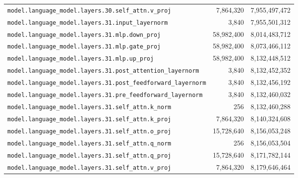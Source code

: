 \documentclass[10pt,a4paper]{article}
\theoremstyle{definition}
\begin{document}
\begin{appendices}
\begin{longtable}{p{9.5cm}rr}
\texttt{model.\allowbreak{}language\_model.\allowbreak{}layers.\allowbreak{}30.\allowbreak{}self\_attn.\allowbreak{}v\_proj} & 7,864,320 & 7,955,497,472 \\
\texttt{model.\allowbreak{}language\_model.\allowbreak{}layers.\allowbreak{}31.\allowbreak{}input\_layernorm} & 3,840 & 7,955,501,312 \\
\texttt{model.\allowbreak{}language\_model.\allowbreak{}layers.\allowbreak{}31.\allowbreak{}mlp.\allowbreak{}down\_proj} & 58,982,400 & 8,014,483,712 \\
\texttt{model.\allowbreak{}language\_model.\allowbreak{}layers.\allowbreak{}31.\allowbreak{}mlp.\allowbreak{}gate\_proj} & 58,982,400 & 8,073,466,112 \\
\texttt{model.\allowbreak{}language\_model.\allowbreak{}layers.\allowbreak{}31.\allowbreak{}mlp.\allowbreak{}up\_proj} & 58,982,400 & 8,132,448,512 \\
\texttt{model.\allowbreak{}language\_model.\allowbreak{}layers.\allowbreak{}31.\allowbreak{}post\_attention\_layernorm} & 3,840 & 8,132,452,352 \\
\texttt{model.\allowbreak{}language\_model.\allowbreak{}layers.\allowbreak{}31.\allowbreak{}post\_feedforward\_layernorm} & 3,840 & 8,132,456,192 \\
\texttt{model.\allowbreak{}language\_model.\allowbreak{}layers.\allowbreak{}31.\allowbreak{}pre\_feedforward\_layernorm} & 3,840 & 8,132,460,032 \\
\texttt{model.\allowbreak{}language\_model.\allowbreak{}layers.\allowbreak{}31.\allowbreak{}self\_attn.\allowbreak{}k\_norm} & 256 & 8,132,460,288 \\
\texttt{model.\allowbreak{}language\_model.\allowbreak{}layers.\allowbreak{}31.\allowbreak{}self\_attn.\allowbreak{}k\_proj} & 7,864,320 & 8,140,324,608 \\
\texttt{model.\allowbreak{}language\_model.\allowbreak{}layers.\allowbreak{}31.\allowbreak{}self\_attn.\allowbreak{}o\_proj} & 15,728,640 & 8,156,053,248 \\
\texttt{model.\allowbreak{}language\_model.\allowbreak{}layers.\allowbreak{}31.\allowbreak{}self\_attn.\allowbreak{}q\_norm} & 256 & 8,156,053,504 \\
\texttt{model.\allowbreak{}language\_model.\allowbreak{}layers.\allowbreak{}31.\allowbreak{}self\_attn.\allowbreak{}q\_proj} & 15,728,640 & 8,171,782,144 \\
\texttt{model.\allowbreak{}language\_model.\allowbreak{}layers.\allowbreak{}31.\allowbreak{}self\_attn.\allowbreak{}v\_proj} & 7,864,320 & 8,179,646,464 \\

\end{longtable}
\end{appendices}
\end{document}
